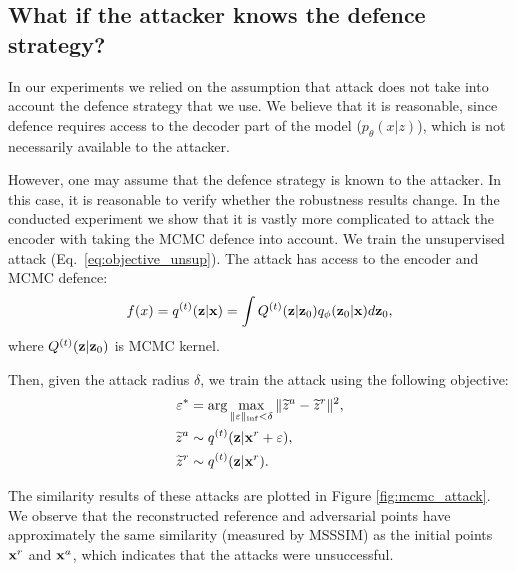 \newpage

\subsection{What if the attacker knows the defence strategy?} \label{appendix:attack_mcmc}
In our experiments we relied on the assumption that attack does not take into account the defence strategy that we use. We believe that it is reasonable, since defence requires access to the decoder part of the model ($p_{\theta}(x|z)$), which is not necessarily available to the attacker. 

However, one may assume that the defence strategy is known to the attacker. In this case, it is reasonable to verify whether the robustness results change. In the conducted experiment we show that it is vastly more complicated to attack the encoder with taking the MCMC defence into account. We train the unsupervised attack (Eq.~\ref{eq:objective_unsup}). The attack has access to the encoder and MCMC defence:
\begin{equation}
f(x) = q^{(t)}({\mathbf{z}}|{\mathbf{x}}) = \int Q^{(t)}({\mathbf{z}}|{\mathbf{z}}_0) q_{\phi}({\mathbf{z}}_0|{\mathbf{x}}) d{\mathbf{z}}_0,
\end{equation}
where $Q^{(t)}({\mathbf{z}}|{\mathbf{z}}_0)$ is MCMC kernel. 

Then, given the attack radius $\delta$, we train the attack using the following objective:
\begin{align}
    \varepsilon^* &= \arg\max_{\|\varepsilon\|_{\inf} < \delta}\|\widetilde{z}^a - \widetilde{z}^r\|^2, \\
    \widetilde{z}^a &\sim q^{(t)}(\rvz|\rvx^r + \varepsilon), \label{eq:z_a_mcmc}\\
    \widetilde{z}^r &\sim q^{(t)}(\rvz|\rvx^r). \label{eq:z_r_mcmc}
\end{align}

The similarity results of these attacks are plotted in Figure \ref{fig:mcmc_attack}. We observe that the reconstructed reference and adversarial points have approximately the same similarity (measured by MSSSIM) as the initial points ${\mathbf{x}}^r$ and ${\mathbf{x}}^a$, which indicates that the attacks were unsuccessful. 


